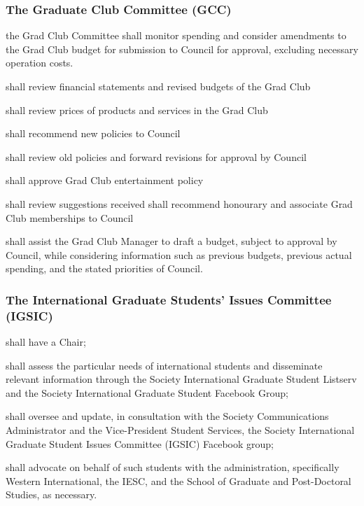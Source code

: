 \subsubsection{The Graduate Club Committee (GCC)}
\begin{longenum}[ label*=\thesubsubsection.\arabic*., align=left]
	\item the Grad Club Committee shall monitor spending and consider amendments to the Grad Club budget for submission to Council for approval, excluding necessary operation costs.
    \item shall review financial statements and revised budgets of the Grad Club
    \item shall review prices of products and services in the Grad Club
    \item shall recommend new policies to Council
    \item shall review old policies and forward revisions for approval by Council
    \item shall approve Grad Club entertainment policy
    \item shall review suggestions received shall recommend honourary and associate Grad Club memberships to Council
    \item shall assist the Grad Club Manager to draft a budget, subject to approval by Council, while considering information such as previous budgets, previous actual spending, and the stated priorities of Council.
\end{longenum}

\subsubsection{The International Graduate Students' Issues Committee (IGSIC)}
\begin{longenum}[ label*=\thesubsubsection.\arabic*., align=left]
    \item shall have a Chair;
    \item shall assess the particular needs of international students and disseminate relevant information through the Society International Graduate Student Listserv and
the Society International Graduate Student Facebook Group;
\item shall oversee and update, in consultation with the Society Communications
Administrator and the Vice-President Student Services, the Society International Graduate Student
Issues Committee (IGSIC) Facebook group;
    \item shall advocate on behalf of such students with the administration, specifically Western International, the IESC, and the School of Graduate and Post-Doctoral Studies, as necessary.
\end{longenum}


